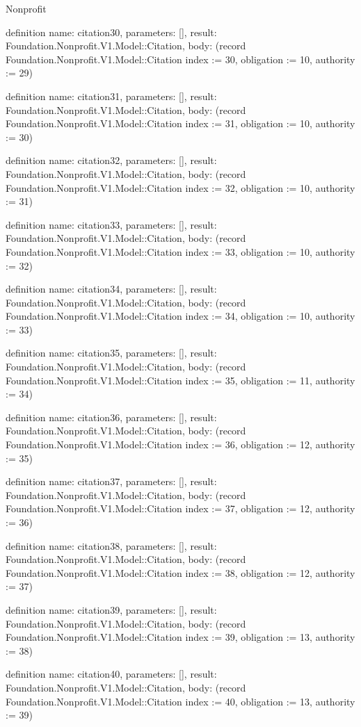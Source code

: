 \begin{lexlean}{Nonprofit}
\begin{semanticmodule}
definition{
  name: citation30,
  parameters: [],
  result: Foundation.Nonprofit.V1.Model::Citation,
  body: (record Foundation.Nonprofit.V1.Model::Citation {index := 30, obligation := 10, authority := 29})
}

definition{
  name: citation31,
  parameters: [],
  result: Foundation.Nonprofit.V1.Model::Citation,
  body: (record Foundation.Nonprofit.V1.Model::Citation {index := 31, obligation := 10, authority := 30})
}

definition{
  name: citation32,
  parameters: [],
  result: Foundation.Nonprofit.V1.Model::Citation,
  body: (record Foundation.Nonprofit.V1.Model::Citation {index := 32, obligation := 10, authority := 31})
}

definition{
  name: citation33,
  parameters: [],
  result: Foundation.Nonprofit.V1.Model::Citation,
  body: (record Foundation.Nonprofit.V1.Model::Citation {index := 33, obligation := 10, authority := 32})
}

definition{
  name: citation34,
  parameters: [],
  result: Foundation.Nonprofit.V1.Model::Citation,
  body: (record Foundation.Nonprofit.V1.Model::Citation {index := 34, obligation := 10, authority := 33})
}

definition{
  name: citation35,
  parameters: [],
  result: Foundation.Nonprofit.V1.Model::Citation,
  body: (record Foundation.Nonprofit.V1.Model::Citation {index := 35, obligation := 11, authority := 34})
}

definition{
  name: citation36,
  parameters: [],
  result: Foundation.Nonprofit.V1.Model::Citation,
  body: (record Foundation.Nonprofit.V1.Model::Citation {index := 36, obligation := 12, authority := 35})
}

definition{
  name: citation37,
  parameters: [],
  result: Foundation.Nonprofit.V1.Model::Citation,
  body: (record Foundation.Nonprofit.V1.Model::Citation {index := 37, obligation := 12, authority := 36})
}

definition{
  name: citation38,
  parameters: [],
  result: Foundation.Nonprofit.V1.Model::Citation,
  body: (record Foundation.Nonprofit.V1.Model::Citation {index := 38, obligation := 12, authority := 37})
}

definition{
  name: citation39,
  parameters: [],
  result: Foundation.Nonprofit.V1.Model::Citation,
  body: (record Foundation.Nonprofit.V1.Model::Citation {index := 39, obligation := 13, authority := 38})
}

definition{
  name: citation40,
  parameters: [],
  result: Foundation.Nonprofit.V1.Model::Citation,
  body: (record Foundation.Nonprofit.V1.Model::Citation {index := 40, obligation := 13, authority := 39})
}


\end{semanticmodule}
\end{lexlean}
